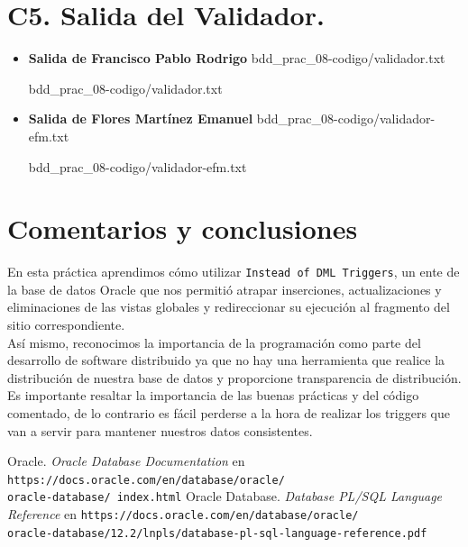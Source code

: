 \documentclass{article}
\newcommand{\codedir}{bdd_prac_08-codigo}
\begin{document}
\section*{C5. Salida del Validador.}

\begin{itemize}
  \item \textbf{Salida de Francisco Pablo Rodrigo}
     {\codedir/validador.txt}
    
    {\codedir/validador.txt}

  \item \textbf{Salida de Flores Martínez Emanuel}
     {\codedir/validador-efm.txt}
    
    {\codedir/validador-efm.txt}
\end{itemize}

\section*{Comentarios y conclusiones}

En esta práctica aprendimos cómo utilizar \texttt{Instead of DML Triggers},
un ente de la base de datos Oracle que nos permitió atrapar inserciones,
actualizaciones y eliminaciones de las vistas globales y redireccionar su
ejecución al fragmento del sitio correspondiente.\\

Así mismo, reconocimos la importancia de la programación como parte del
desarrollo de software distribuido ya que no hay una herramienta que realice la
distribución de nuestra base de datos y proporcione transparencia de
distribución. Es importante resaltar la importancia de las buenas prácticas y
del código comentado, de lo contrario es fácil perderse a la hora de realizar
los triggers que van a servir para mantener nuestros datos consistentes.

\renewcommand\refname{Bibliografía}
\begin{thebibliography}{99}
     Oracle. \textit{Oracle Database Documentation} en 
        \texttt{https://docs.oracle.com/en/database/oracle/\\oracle-database/%
        index.html}
     Oracle Database. \textit{Database PL/SQL Language 
        Reference} en 
        \texttt{https://docs.oracle.com/en/database/oracle/\\
        oracle-database/12.2/lnpls/database-pl-sql-language-reference.pdf}
\end{thebibliography}
\end{document}
